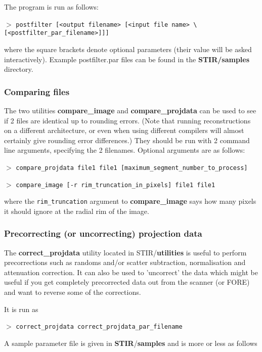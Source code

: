 \documentclass{article}
\newcommand{\cmdline}[1]{\par \noindent $>$ \texttt{#1}\par}
\begin{document}
The program is run as follows:
\cmdline{postfilter [\texttt{<}output filename\texttt{>} [\texttt{<}input file 
name\texttt{>} {\textbackslash}\\
{[}\texttt{<}postfilter\_par\_filename\texttt{>}]]]}

where the square brackets denote optional parameters (their value 
will be asked interactively). Example postfilter.par files can 
be found in the \textbf{STIR/samples} directory.


\subsubsection{
Comparing files}

The two utilities \textbf{compare\_image} and \textbf{compare\_projdata} 
can be used to see if 2 files are identical up to rounding errors. 
(Note that running reconstructions on a different architecture, 
or even when using different compilers will almost certainly 
give rounding error differences.) They should be run with 2 command 
line arguments, specifying the 2 filenames. Optional arguments 
are as follows:
\cmdline{compare\_projdata file1 file1 
[maximum\_segment\_number\_to\_process]}
\cmdline{compare\_image [-r rim\_truncation\_in\_pixels] file1 file1}


where the \texttt{rim\_truncation} argument to \textbf{compare\_image}  says 
how many pixels it should ignore at the radial rim of the image.



\subsubsection{
Precorrecting (or uncorrecting) projection data}

The \textbf{correct\_projdata} utility located in STIR/\textbf{utilities} 
is useful to perform precorrections such as randoms and/or scatter 
subtraction, normalisation and attenuation correction. It can 
also be used to 'uncorrect' the data which might be useful if 
you get completely precorrected data out from the scanner (or 
FORE) and want to reverse some of the corrections.


It is run as
\cmdline{correct\_projdata correct\_projdata\_par\_filename}


A sample parameter file is given in \textbf{STIR}/\textbf{samples} and 
is more or less as follows
\end{document}

